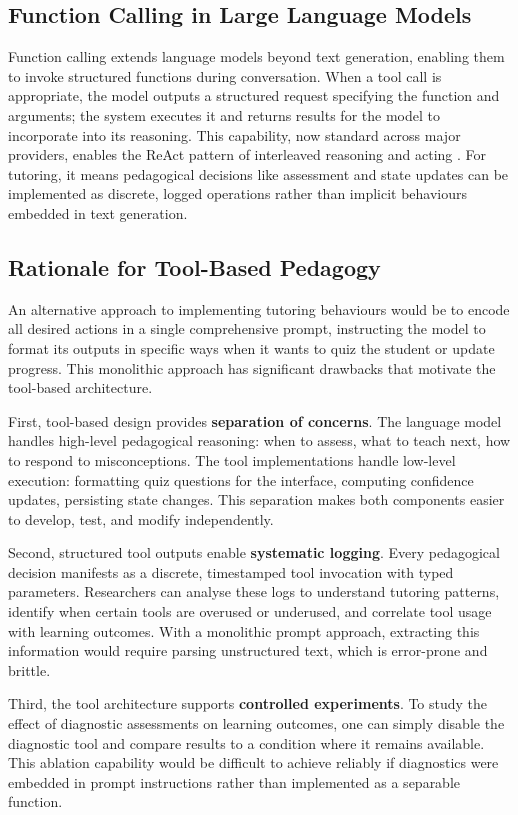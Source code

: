 \documentclass[logo,bsc,singlespacing,parskip,online]{infthesis}
\begin{document}
\subsection{Function Calling in Large Language Models}

Function calling extends language models beyond text generation, enabling them to invoke structured functions during conversation. When a tool call is appropriate, the model outputs a structured request specifying the function and arguments; the system executes it and returns results for the model to incorporate into its reasoning. This capability, now standard across major providers, enables the ReAct pattern of interleaved reasoning and acting \citep{yao2022react}. For tutoring, it means pedagogical decisions like assessment and state updates can be implemented as discrete, logged operations rather than implicit behaviours embedded in text generation.

\subsection{Rationale for Tool-Based Pedagogy}

An alternative approach to implementing tutoring behaviours would be to encode all desired actions in a single comprehensive prompt, instructing the model to format its outputs in specific ways when it wants to quiz the student or update progress. This monolithic approach has significant drawbacks that motivate the tool-based architecture.

First, tool-based design provides \textbf{separation of concerns}. The language model handles high-level pedagogical reasoning: when to assess, what to teach next, how to respond to misconceptions. The tool implementations handle low-level execution: formatting quiz questions for the interface, computing confidence updates, persisting state changes. This separation makes both components easier to develop, test, and modify independently.

Second, structured tool outputs enable \textbf{systematic logging}. Every pedagogical decision manifests as a discrete, timestamped tool invocation with typed parameters. Researchers can analyse these logs to understand tutoring patterns, identify when certain tools are overused or underused, and correlate tool usage with learning outcomes. With a monolithic prompt approach, extracting this information would require parsing unstructured text, which is error-prone and brittle.

Third, the tool architecture supports \textbf{controlled experiments}. To study the effect of diagnostic assessments on learning outcomes, one can simply disable the diagnostic tool and compare results to a condition where it remains available. This ablation capability would be difficult to achieve reliably if diagnostics were embedded in prompt instructions rather than implemented as a separable function.
\end{document}

